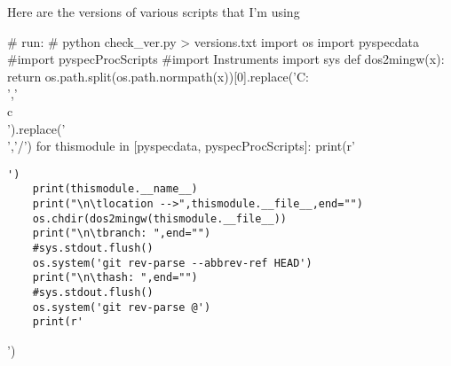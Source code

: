 \documentclass[10pt]{article}
\begin{document}
Here are the versions of various scripts that I'm using
\par
\begin{python}[on]
# run:
# python check_ver.py > versions.txt
import os
import pyspecdata
#import pyspecProcScripts
#import Instruments
import sys
def dos2mingw(x):
    return os.path.split(os.path.normpath(x))[0].replace('C:\\','\\c\\').replace('\\','/')
for thismodule in [pyspecdata, pyspecProcScripts]:
    print(r'\begin{verbatim}')
    print(thismodule.__name__)
    print("\n\tlocation -->",thismodule.__file__,end="")
    os.chdir(dos2mingw(thismodule.__file__))
    print("\n\tbranch: ",end="")
    #sys.stdout.flush()
    os.system('git rev-parse --abbrev-ref HEAD')
    print("\n\thash: ",end="")
    #sys.stdout.flush()
    os.system('git rev-parse @')
    print(r'\end{verbatim}')
\end{python}
\par





\end{document}
